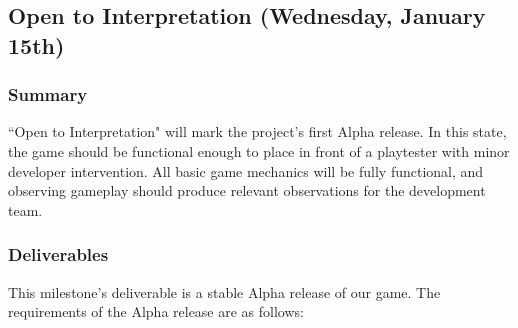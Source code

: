 \subsection{Open to Interpretation (Wednesday, January 15th)}

\subsubsection*{Summary}
``Open to Interpretation" will mark the project's first Alpha release. In this state, the game 
should be functional enough to place in front of a playtester with minor developer 
intervention. All basic game mechanics will be fully functional, and observing gameplay 
should produce relevant observations for the development team.

\subsubsection*{Deliverables}
This milestone’s deliverable is a stable Alpha release of our game. The requirements of the 
Alpha release are as follows:

